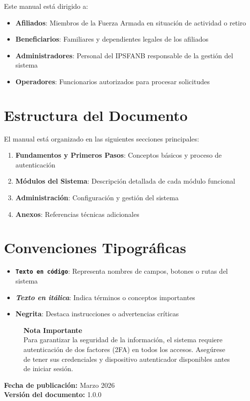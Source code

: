 Este manual está dirigido a:

\begin{itemize}[leftmargin=*]
    \item \textbf{Afiliados}: Miembros de la Fuerza Armada en situación de actividad o retiro
    \item \textbf{Beneficiarios}: Familiares y dependientes legales de los afiliados
    \item \textbf{Administradores}: Personal del IPSFANB responsable de la gestión del sistema
    \item \textbf{Operadores}: Funcionarios autorizados para procesar solicitudes
\end{itemize}

\section*{Estructura del Documento}

El manual está organizado en las siguientes secciones principales:

\begin{enumerate}[leftmargin=*]
    \item \textbf{Fundamentos y Primeros Pasos}: Conceptos básicos y proceso de autenticación
    \item \textbf{Módulos del Sistema}: Descripción detallada de cada módulo funcional
    \item \textbf{Administración}: Configuración y gestión del sistema
    \item \textbf{Anexos}: Referencias técnicas adicionales
\end{enumerate}

\section*{Convenciones Tipográficas}

\begin{itemize}[leftmargin=*]
    \item \textbf{\texttt{Texto en código}}: Representa nombres de campos, botones o rutas del sistema
    \item \textbf{\textit{Texto en itálica}}: Indica términos o conceptos importantes
    \item \textbf{\textbf{Negrita}}: Destaca instrucciones o advertencias críticas
\end{itemize}

\begin{figure}[H]
\centering
\begin{tcolorbox}[
    enhanced,
    colback=sandraSoft,
    colframe=sandraGreen,
    width=0.9\textwidth,
    halign=center
]
\small
\textbf{Nota Importante}\\
\smallskip
Para garantizar la seguridad de la información, el sistema requiere autenticación de dos factores (2FA) en todos los accesos. Asegúrese de tener sus credenciales y dispositivo autenticador disponibles antes de iniciar sesión.
\end{tcolorbox}
\end{figure}

\vfill

\begin{flushright}
\textbf{Fecha de publicación:} Marzo 2026\\
\textbf{Versión del documento:} 1.0.0
\end{flushright}

\newpage
